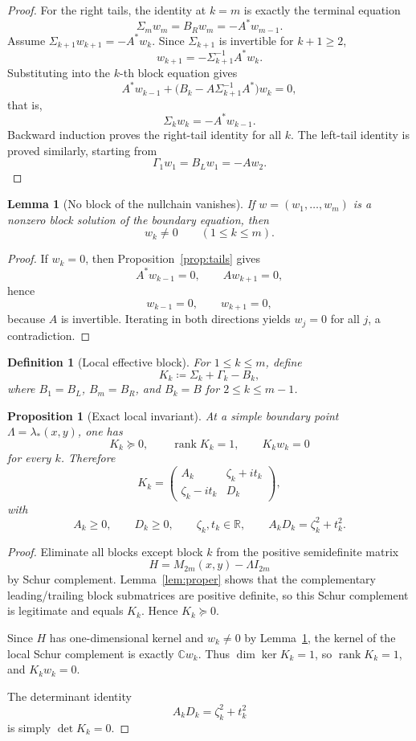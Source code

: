 \documentclass[11pt]{article}
\newtheorem{lemma}[theorem]{Lemma}
\newtheorem{proposition}[theorem]{Proposition}
\newtheorem{definition}[theorem]{Definition}
\newcommand{\C}{\mathbb C}
\newcommand{\R}{\mathbb R}
\begin{document}
\begin{proof}
For the right tails, the identity at \(k=m\) is exactly the terminal equation
\[
\Sigma_m w_m=B_R w_m=-A^*w_{m-1}.
\]
Assume \(\Sigma_{k+1}w_{k+1}=-A^*w_k\). Since \(\Sigma_{k+1}\) is invertible for \(k+1\ge 2\),
\[
w_{k+1}=-\Sigma_{k+1}^{-1}A^*w_k.
\]
Substituting into the \(k\)-th block equation gives
\[
A^*w_{k-1}+\bigl(B_k-A\Sigma_{k+1}^{-1}A^*\bigr)w_k=0,
\]
that is,
\[
\Sigma_k w_k=-A^*w_{k-1}.
\]
Backward induction proves the right-tail identity for all \(k\). The left-tail identity is
proved similarly, starting from
\[
\Gamma_1 w_1=B_L w_1=-Aw_2.
\]
\end{proof}

\begin{lemma}[No block of the nullchain vanishes]\label{lem:blocknonzero}
If \(w=(w_1,\dots,w_m)\) is a nonzero block solution of the boundary equation, then
\[
w_k\neq 0
\qquad
(1\le k\le m).
\]
\end{lemma}

\begin{proof}
If \(w_k=0\), then Proposition~\ref{prop:tails} gives
\[
A^*w_{k-1}=0,
\qquad
Aw_{k+1}=0,
\]
hence
\[
w_{k-1}=0,
\qquad
w_{k+1}=0,
\]
because \(A\) is invertible. Iterating in both directions yields \(w_j=0\) for all \(j\), a
contradiction.
\end{proof}

\begin{definition}[Local effective block]
For \(1\le k\le m\), define
\[
K_k\coloneqq \Sigma_k+\Gamma_k-B_k,
\]
where \(B_1=B_L\), \(B_m=B_R\), and \(B_k=B\) for \(2\le k\le m-1\).
\end{definition}

\begin{proposition}[Exact local invariant]\label{prop:K}
At a simple boundary point \(\Lambda=\lambda_*(x,y)\), one has
\[
K_k\succeq 0,
\qquad
\operatorname{rank}K_k=1,
\qquad
K_k w_k=0
\]
for every \(k\). Therefore
\[
K_k=
\begin{pmatrix}
A_k & \zeta_k+i t_k\\
\zeta_k-i t_k & D_k
\end{pmatrix},
\]
with
\[
A_k\ge 0,\qquad D_k\ge 0,\qquad \zeta_k,t_k\in\R,
\qquad
A_kD_k=\zeta_k^2+t_k^2.
\]
\end{proposition}

\begin{proof}
Eliminate all blocks except block \(k\) from the positive semidefinite matrix
\[
H=M_{2m}(x,y)-\Lambda I_{2m}
\]
by Schur complement. Lemma~\ref{lem:proper} shows that the complementary leading/trailing block
submatrices are positive definite, so this Schur complement is legitimate and equals \(K_k\).
Hence \(K_k\succeq 0\).

Since \(H\) has one-dimensional kernel and \(w_k\neq 0\) by Lemma~\ref{lem:blocknonzero}, the
kernel of the local Schur complement is exactly \(\C w_k\). Thus \(\dim\ker K_k=1\), so
\(\operatorname{rank}K_k=1\), and \(K_k w_k=0\).

The determinant identity
\[
A_kD_k=\zeta_k^2+t_k^2
\]
is simply \(\det K_k=0\).
\end{proof}
\end{document}
